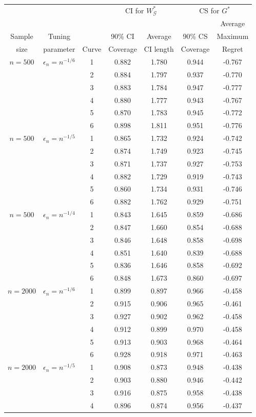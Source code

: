 \documentclass[12pt,oneside,reqno,english]{amsart}
\theoremstyle{definition}
\begin{document}
\begin{table}[H]
\vspace{0.5cm}
\begin{tabular}{ccc|cc|cc}
 &  & & \multicolumn{2}{c|}{CI for $W^{*}_{\mathcal{G}}$} & \multicolumn{2}{c}{CS for $G^{*}$}   \tabularnewline
                     &  &            &                  &                 &                           & Average                            \tabularnewline
 Sample                    & Tuning   &            & 90\% CI   & Average   & 90\% CS           & Maximum                          \tabularnewline
 size & parameter & Curve & Coverage & CI length  & Coverage & Regret          \tabularnewline
\hline 
$n=500$& $\epsilon_{n}=n^{-1/6}$ & 1 & 0.882 & 1.780 & 0.944  & -0.767  \tabularnewline
      & & 2 & 0.884 & 1.797 & 0.937  & -0.770   \tabularnewline
     &  & 3 & 0.883 & 1.784 & 0.947  & -0.777  \tabularnewline
     &  & 4 & 0.880 & 1.777 & 0.943  & -0.767  \tabularnewline
     &  & 5 & 0.870 & 1.783 & 0.945  & -0.772  \tabularnewline
     &  & 6 & 0.898 & 1.811 & 0.951  & -0.776  \tabularnewline
\hline 
$n=500$ & $\epsilon_{n}=n^{-1/5}$ & 1 & 0.865 & 1.732 & 0.924 & -0.742  \tabularnewline
      & & 2 & 0.874 & 1.749 & 0.923  & -0.745  \tabularnewline
      & & 3 & 0.871 & 1.737 & 0.927  & -0.753  \tabularnewline
      & & 4 & 0.882 & 1.729 & 0.919  & -0.743  \tabularnewline
     & & 5 & 0.860 & 1.734  & 0.931  & -0.746  \tabularnewline
     & & 6 & 0.882 & 1.762  & 0.929  & -0.751  \tabularnewline
\hline 
$n=500$& $\epsilon_{n}=n^{-1/4}$ & 1 & 0.843 & 1.645 & 0.859 & -0.686  \tabularnewline
     &  & 2 & 0.847 & 1.660 & 0.854  & -0.688  \tabularnewline
    & & 3 & 0.846 & 1.648 & 0.858  & -0.698  \tabularnewline
    &   & 4 & 0.851 & 1.640 & 0.839  & -0.688  \tabularnewline
    &  & 5 & 0.836 & 1.646  & 0.858  & -0.692  \tabularnewline
    &  & 6 & 0.848 & 1.673  & 0.860  & -0.697  \tabularnewline
\hline 
$n=2000$& $\epsilon_{n}=n^{-1/6}$ & 1 & 0.899 & 0.897 & 0.966  & -0.458  \tabularnewline
     &  & 2 & 0.915 & 0.906 & 0.965  & -0.461   \tabularnewline
    & & 3 & 0.927 & 0.902 & 0.962  & -0.458  \tabularnewline
    &   & 4 & 0.912 & 0.899 & 0.970  & -0.458  \tabularnewline
    &   & 5 & 0.913 & 0.903 & 0.968  & -0.464  \tabularnewline
     &  & 6 & 0.928 & 0.918 & 0.971  & -0.463  \tabularnewline
\hline 
$n=2000$ & $\epsilon_{n}=n^{-1/5}$ & 1 & 0.908 & 0.873 & 0.948 & -0.438  \tabularnewline
      & & 2 & 0.903 & 0.880 &  0.946 & -0.442  \tabularnewline
      & & 3 & 0.916 & 0.875 & 0.958  & -0.438  \tabularnewline
      & & 4 & 0.896 & 0.874 & 0.956  & -0.437  \tabularnewline

\end{tabular}
\end{table}
\end{document}
